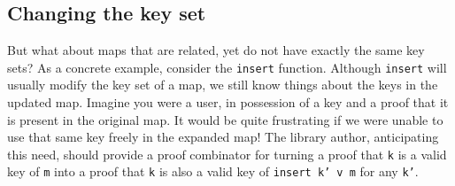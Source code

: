 \documentclass[format=sigplan, review=false, screen=true]{acmart}
\begin{document}




\subsection{Changing the key set}\label{changing-keys}
But what about maps that are related, yet do not have exactly the same key sets?
As a concrete example, consider the \texttt{insert} function. Although \texttt{insert} will usually
modify the key set of a map, we still know things about the keys in the updated map.
 Imagine you were a user, in possession of a key and a proof
that it is present in the original map. It would be quite frustrating if  we were
unable to use that same key freely in the expanded map!
The library author, anticipating this need, should provide a proof combinator for
turning a proof that \texttt{k} is a valid key of \texttt{m} into a proof that
\texttt{k} is also a valid key of \texttt{insert k' v m} for any \texttt{k'}.
\end{document}
